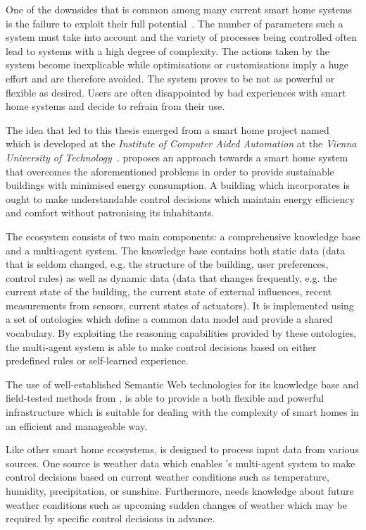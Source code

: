 One of the downsides that is common among many current smart home systems is the failure to exploit their full potential~\cite{HomeAutomationChallengesOpportunities,HomeMaestro,StateOfHomeNetworking}. The number of parameters such a system must take into account and the variety of processes being controlled often lead to systems with a high degree of complexity. The actions taken by the system become inexplicable while optimisations or customisations imply a huge effort and are therefore avoided. The system proves to be not as powerful or flexible as desired. Users are often disappointed by bad experiences with smart home systems and decide to refrain from their use.

The idea that led to this thesis emerged from a smart home project named \thinkhome~\cite{ThinkHomeWeb} which is developed at the \emph{Institute of Computer Aided Automation} at the \emph{Vienna University of Technology}~\cite{CR2011-TH_Journal,CR2010-DEST_ThinkHome}. \thinkhome proposes an approach towards a smart home system that overcomes the aforementioned problems in order to provide sustainable buildings with minimised energy consumption. A building which incorporates \thinkhome is ought to make understandable control decisions which maintain energy efficiency and comfort without patronising its inhabitants.

The \thinkhome ecosystem consists of two main components: a comprehensive knowledge base and a multi-agent system. The knowledge base contains both static data (data that is seldom changed, e.g. the structure of the building, user preferences, control rules) as well as dynamic data (data that changes frequently, e.g. the current state of the building, the current state of external influences, recent measurements from sensors, current states of actuators). It is implemented using a set of ontologies which define a common data model and provide a shared vocabulary. By exploiting the reasoning capabilities provided by these ontologies, the multi-agent system is able to make control decisions based on either predefined rules or self-learned experience.

The use of well-established Semantic Web technologies for its knowledge base and field-tested methods from , \thinkhome is able to provide a both flexible and powerful infrastructure which is suitable for dealing with the complexity of smart homes in an efficient and manageable way.

Like other smart home ecosystems, \thinkhome is designed to process input data from various sources. One source is weather data which enables \thinkhome's multi-agent system to make control decisions based on current weather conditions such as temperature, humidity, precipitation, or sunshine. Furthermore, \thinkhome needs knowledge about future weather conditions such as upcoming sudden changes of weather which may be required by specific control decisions in advance.

